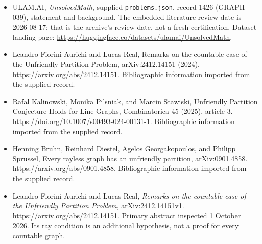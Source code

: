 \documentclass[11pt,a4paper]{article}
\begin{document}
{\small

\begin{itemize}

\item[\hypertarget{source:1426:1}{S1}] ULAM.AI, \emph{UnsolvedMath}, supplied \texttt{problems.json}, record 1426 (GRAPH-039), statement and background. The embedded literature-review date is 2026-08-17; that is the archive’s review date, not a fresh certification. Dataset landing page: \url{https://huggingface.co/datasets/ulamai/UnsolvedMath}.

\item[\hypertarget{source:1426:2}{S2}] Leandro Fiorini Aurichi and Lucas Real, Remarks on the countable case of the Unfriendly Partition Problem, arXiv:2412.14151 (2024). \url{https://arxiv.org/abs/2412.14151}. Bibliographic information imported from the supplied record.

\item[\hypertarget{source:1426:3}{S3}] Rafal Kalinowski, Monika Pilsniak, and Marcin Stawiski, Unfriendly Partition Conjecture Holds for Line Graphs, Combinatorica 45 (2025), article 3. \url{https://doi.org/10.1007/s00493-024-00131-1}. Bibliographic information imported from the supplied record.

\item[\hypertarget{source:1426:4}{S4}] Henning Bruhn, Reinhard Diestel, Agelos Georgakopoulos, and Philipp Sprussel, Every rayless graph has an unfriendly partition, arXiv:0901.4858. \url{https://arxiv.org/abs/0901.4858}. Bibliographic information imported from the supplied record.


\item[E1] Leandro Fiorini Aurichi and Lucas Real,
\emph{Remarks on the countable case of the Unfriendly Partition
Problem}, arXiv:2412.14151v1. \url{https://arxiv.org/abs/2412.14151}.
Primary abstract inspected 1 October 2026. Its ray condition is an
additional hypothesis, not a proof for every countable graph.

\end{itemize}

}

\label{end:1426}
\end{document}

